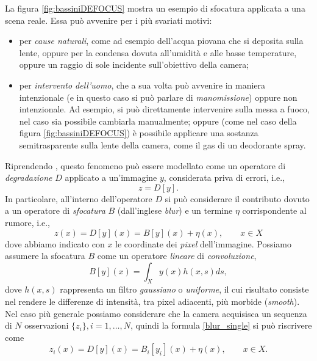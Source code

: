 \noindent La figura \ref{fig:bassiniDEFOCUS} mostra un esempio di sfocatura applicata a una scena reale. 
Essa pu\`o avvenire per i pi\`u svariati motivi: 
\begin{itemize}
	\item per \textit{cause naturali}, come ad esempio dell'acqua piovana che si deposita sulla lente, oppure per la condensa dovuta all'umidit\`a e alle basse temperature, oppure un raggio di sole incidente sull'obiettivo della camera;
	\item per \textit{intervento dell'uomo}, che a sua volta pu\`o avvenire in maniera intenzionale (e in questo caso si pu\`o parlare di \textit{manomissione}) oppure non intenzionale. Ad esempio, si pu\`o direttamente intervenire sulla messa a fuoco, nel caso sia possibile cambiarla manualmente; oppure (come nel caso della figura \ref{fig:bassiniDEFOCUS}) \`e possibile applicare una sostanza semitrasparente sulla lente della camera, come il gas di un deodorante spray.
\end{itemize}
Riprendendo \cite{alippi2010detecting}, questo fenomeno pu\`o essere modellato come un operatore di \textit{degradazione} $D$ applicato a un'immagine $y$, considerata priva di errori, i.e.,
\begin{equation}
z=D[y].
\end{equation}
In particolare, all'interno dell'operatore $D$ si pu\`o considerare il contributo dovuto a un operatore di \textit{sfocatura} $B$ (dall'inglese \textit{blur}) e un termine $\eta$ corrispondente al rumore, i.e.,
\begin{equation}
\label{blur_single}
z(x)=D[y](x) = B[y](x) + \eta(x), \qquad x \in X
\end{equation}
dove abbiamo indicato con $x$ le coordinate dei \textit{pixel} dell'immagine. 
Possiamo assumere la sfocatura $B$ come un operatore \textit{lineare} di \textit{convoluzione},
\begin{equation}
B[y](x) = \int_{X}y(x)h(x,s)ds,
\end{equation}
dove $h(x,s)$ rappresenta un filtro \textit{gaussiano} o \textit{uniforme}, il cui risultato consiste nel rendere le differenze di intensit\`a, tra pixel adiacenti, pi\`u morbide (\textit{smooth}).\\
Nel caso pi\`u generale possiamo considerare che la camera acquisisca un sequenza di $N$ osservazioni $\{z_i\}, i = 1, \dots ,N$, quindi la formula \ref{blur_single} si pu\`o riscrivere come
\begin{equation}
\label{blur_multi}
z_i(x)=D[y](x) = B_i[y_i](x) + \eta(x), \qquad x \in X.
\end{equation}
